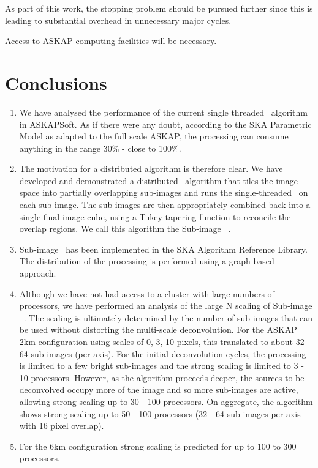 \documentclass[11pt,a4paper,variablewidth]{article}
\begin{document}
As part of this work, the stopping problem should be pursued further since this is leading to substantial overhead in unnecessary major cycles.

Access to ASKAP computing facilities will be necessary. 

\pagebreak
\section{Conclusions}

\begin{enumerate}
	\item We have analysed the performance of the current single threaded \MAM\ algorithm in ASKAPSoft. As if there were any doubt, according to the SKA Parametric Model as adapted to the full scale ASKAP, the processing can consume anything in the range 30\% - close to 100\%.
	\item The motivation for a distributed algorithm is therefore clear. We have developed and demonstrated a distributed \MAM\ algorithm that tiles the image space into partially overlapping sub-images and runs the single-threaded \MAM\ on each sub-image. The sub-images are then appropriately combined back into a single final image cube, using a Tukey tapering function to reconcile the overlap regions. We call this algorithm the Sub-image \MAM\ .
	\item Sub-image \MAM\ has been implemented in the SKA Algorithm Reference Library. The distribution of the processing is performed using a graph-based approach.
	\item Although we have not had access to a cluster with large numbers of processors, we have performed an analysis of the large N scaling of Sub-image \MAM\ . The scaling is ultimately determined by the number of sub-images that can be used without distorting the multi-scale deconvolution. For the ASKAP 2km configuration using scales of 0, 3, 10 pixels, this translated to about 32 - 64 sub-images (per axis). For the initial deconvolution cycles, the processing is limited to a few bright sub-images and the strong scaling is limited to 3 - 10 processors. However, as the algorithm proceeds deeper, the sources to be deconvolved occupy more of the image and so more sub-images are active, allowing strong scaling up to 30 - 100 processors. On aggregate, the algorithm shows strong scaling up to 50 - 100 processors (32 - 64 sub-images per axis with 16 pixel overlap).
	\item For the 6km configuration strong scaling is predicted for up to 100 to 300 processors.

\end{enumerate}
\end{document}
